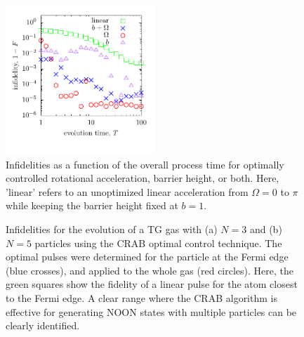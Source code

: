 \begin{figure}
 \centering \includegraphics[width=0.5\textwidth]{data/1d/figlfid.pdf}
\caption{ Infidelities as a function of the overall process time for optimally controlled rotational acceleration, barrier height, or both.
Here, 'linear' refers to an unoptimized linear acceleration from $\Omega = 0$ to $\pi$ while keeping the barrier height fixed at $b=1$.
}
\label{fig:lfid}
\end{figure}

\begin{figure}[t]
 \centering
 \caption{
Infidelities for the evolution of a TG gas with (a) $N=3$ and (b) $N=5$ particles using the CRAB optimal control technique.
The optimal pulses were determined for the particle at the Fermi edge (blue crosses), and applied to the whole gas (red circles). 
Here, the green squares show the fidelity of a linear pulse for the atom closest to the Fermi edge.
A clear range where the CRAB algorithm is effective for generating NOON states with multiple particles can be clearly identified.}
 \label{fig:TGOC}
\end{figure} 


